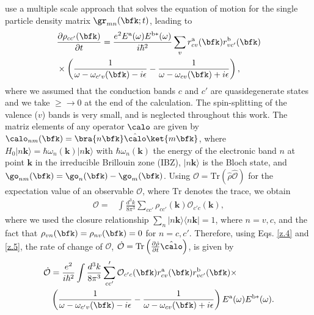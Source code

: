 \documentclass[prb,11pt,tightenlines,twocolumn,aps]{revtex4-1}
\begin{document}
use a multiple
scale approach that solves the equation of motion for the single
particle density matrix $\gr_{mn}(\bfk;t)$, leading to
\begin{align}\label{z.4}
&\frac{\partial \rho_{cc'}(\bfk)}{\partial t} =
\frac{e^{2}E^{\mathrm{a}}(\omega)E^{\mathrm{b*}}(\omega)}
{i \hbar^{2}}
\sum_{v}r^{\mathrm{a}}_{cv}(\bfk) r^{\mathrm{b}}_{vc'}(\bfk)
\nonumber\\
&\times 
\left( \frac{1}{\omega - \omega_{c'v}(\bfk) - i \epsilon} 
- 
\frac{1}{\omega - \omega_{cv}(\bfk) + i \epsilon} \right)
,
\end{align}
where we assumed that the conduction bands $c$ and $c'$
are quasidegenerate  states and we take $\ge\to 0$ at the end of the
calculation.  The spin-splitting of the valence ($v$) bands is very
small, and is neglected throughout this work.\cite{??}
The matriz elements of any operator $\calo$ are given by
$\calo_{nm}(\bfk)=\bra{n\bfk}\hat\calo\ket{m\bfk}$,
where 
$H_{0}|n\mathbf{k}\rangle = \hbar \omega_{n}(\mathbf{k})|n\mathbf{k}\rangle$ 
with $\hbar \omega_{n}(\mathbf{k})$ the energy of the
electronic band $n$ at point $\mathbf{k}$ in the irreducible Brillouin zone
(IBZ),  $|n\mathbf{k}\rangle$ is the Bloch state, and 
$\go_{nm}(\bfk)=\go_{n}(\bfk)-\go_{m}(\bfk)$.
Using 
$\mathcal{O} = \mathrm{Tr}(\hat{\rho}\hat{\mathcal{O}})$
for the expectation value of an observable $\mathcal{O}$, 
where $\mathrm{Tr}$ denotes the trace, we obtain
\begin{align}\label{z.5}
\mathcal{O} 
=& 
\int \frac{d^{3}k}{8\pi^{3}} \sum_{cc'} \rho_{cc'}(\mathbf{k}) 
\mathcal{O}_{c'c}(\mathbf{k}),
\end{align}
where we used 
the closure
relationship $\sum_{n}|n\mathbf{k}\rangle \langle n\mathbf{k}| = 1$,
where $n=v,c$,
and the fact that $\rho_{vn}(\bfk)=\rho_{nv}(\bfk)=0$ for $n=c,c'$. 
Therefore, 
using  Eqs. \eqref{z.4} and \eqref{z.5},
the
rate of change of $\mathcal{O}$,
$\dot{\mathcal{O}} 
=
\mathrm{Tr} \left( \frac{\partial \hat{{\rho}}}{\partial t} \hat\calo \right)
$,
 is given by
\begin{align}
\dot{\mathcal{O}} 
&=\frac{e^{2}}{i\hbar^{2}} \int \frac{d^{3}k}{8\pi^{3}} 
\sum'_{cc'} \mathcal{O}_{c'c}(\bfk) 
r^{\mathrm{a}}_{cv}(\bfk)  r^{\mathrm{b}}_{vc'}(\bfk)  \times
\nonumber \\
& \left( \frac{1}{\omega - \omega_{c'v}(\bfk)  - i\epsilon} - 
\frac{1}{\omega - \omega_{cv}(\bfk)  + i\epsilon} \right)
E^{\mathrm{a}}(\omega) E^{\mathrm{b*}}(\omega)
\label{eq:dotO}
.
\end{align}
\end{document}
